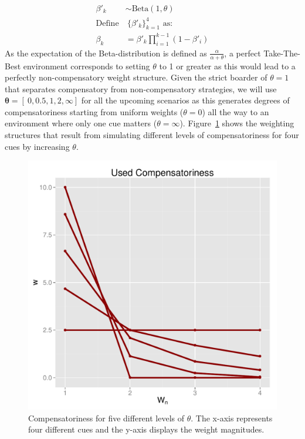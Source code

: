 \documentclass[10pt,letterpaper]{article}
\begin{document}
\begin{align}
\beta'_k &\sim \text{Beta}(1,\theta)\\
\text{Define}&~ \{\beta'_k\}^4_{k=1}\text{ as:}\\
\beta_k&=\beta'_k\prod_{i=1}^{k-1}(1-\beta'_i) 
\end{align}
As the expectation of the Beta-distribution is defined as $\frac{\alpha}{\alpha+\theta}$, a perfect  Take-The-Best environment corresponds to setting $\theta$ to 1 or greater as this would lead to a perfectly non-compensatory weight structure. Given the strict boarder of $\theta=1$ that separates compensatory from non-compensatory strategies, we will use $\mathbf{\theta}=[~0,0.5,1,2,\infty]$ for all the upcoming scenarios as this generates degrees of compensatoriness starting from uniform weights ($\theta=0$) all the way to an environment where only one cue matters ($\theta=\infty$). Figure~\ref{comp} shows the weighting structures that result from simulating different levels of compensatoriness for four cues by increasing $\theta$.  
\begin{figure}[htb!]
  \centering
     \includegraphics[scale=0.4]{comp.pdf}
\caption{Compensatoriness for five different levels of $\theta$. The x-axis represents four different cues and the y-axis displays the weight magnitudes.}
\label{comp}
\end{figure}
\noindent
\end{document}

